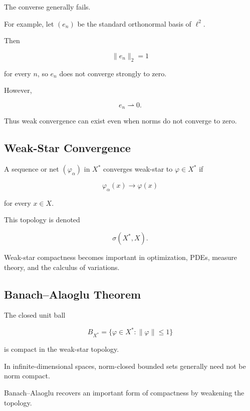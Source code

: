 The converse generally fails.

For example, let \((e_n)\) be the standard orthonormal basis of
\(\ell^2\).

Then

\[
\|e_n\|_2=1
\]

for every \(n\), so \(e_n\) does not converge strongly to zero.

However,

\[
\boxed{
e_n\rightharpoonup0.
}
\]

Thus weak convergence can exist even when norms do not converge to zero.

\subsection{Weak-Star Convergence}
\label{subsec:weak-star-convergence}

A sequence or net \((\varphi_\alpha)\) in \(X^*\) converges weak-star to
\(\varphi\in X^*\) if

\[
\boxed{
\varphi_\alpha(x)
\to
\varphi(x)
}
\]

for every \(x\in X\).

This topology is denoted

\[
\boxed{
\sigma(X^*,X).
}
\]

Weak-star compactness becomes important in optimization, PDEs, measure
theory, and the calculus of variations.

\subsection{Banach--Alaoglu Theorem}
\label{subsec:banach-alaoglu}

\begin{theorem}
The closed unit ball

\[
\boxed{
B_{X^*}
=
\{\varphi\in X^*:\|\varphi\|\leq1\}
}
\]

is compact in the weak-star topology.
\end{theorem}

In infinite-dimensional spaces, norm-closed bounded sets generally need
not be norm compact.

Banach--Alaoglu recovers an important form of compactness by weakening the
topology.

